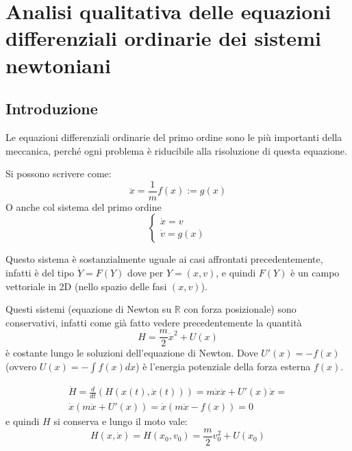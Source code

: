 \documentclass[Main.tex]{subfiles}
\begin{document}
\section[Analisi qualitativa della dinamica]{Analisi qualitativa delle equazioni differenziali ordinarie dei sistemi newtoniani}

\toc

\newpage
\subsection{Introduzione}
Le equazioni differenziali ordinarie del primo ordine sono le più  importanti della meccanica, perché ogni problema è riducibile alla risoluzione di questa equazione. 

Si possono scrivere come:
\begin{equation}
	\ddot x = \frac{1}{m}f(x) := g(x)
\end{equation}
O anche col sistema del primo ordine
\begin{equation}
	\begin{cases}
	\dot x =v \\
	\dot v = g(x)
\end{cases}
\end{equation}

Questo sistema è sostanzialmente uguale ai casi affrontati precedentemente, infatti è del tipo $\dot Y=F(Y)$ dove per $Y=(x,v)$, e quindi $F(Y)$ è un campo vettoriale in 2D (nello spazio delle fasi $(x,v)$).


Questi sistemi (equazione di Newton su $\mathbb{R}$ con forza posizionale) sono conservativi, infatti come già fatto vedere precedentemente la quantità
\begin{equation}
	H= \frac{m}{2} \dot x^2 + U(x)
\end{equation}
è costante lungo le soluzioni dell'equazione di Newton. Dove $U'(x) = -f(x)$ (ovvero $U(x) =- \int f(x) dx$) è l'energia potenziale della forza esterna $f(x)$.

\begin{dm}
\begin{gather}
	\dot H = \frac{d}{dt}(H(x(t), \dot x(t))) = m \dot x \ddot x +U'(x) \dot x=\\
	\dot x (m \ddot x + U'(x)) = \dot x (m \ddot x - f(x))=0
\end{gather}
e quindi $H$ si conserva e lungo il moto vale:
\begin{equation}
	H(x,\dot x)= H(x_0,v_0)= \frac{m}{2} v_0^2 + U(x_0)
\end{equation}
\end{dm}
\end{document}
